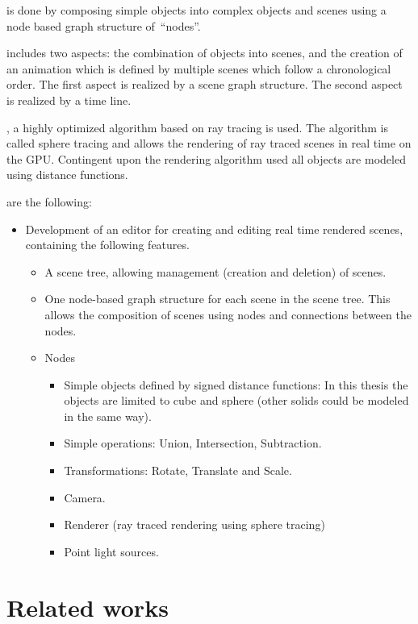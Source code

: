 \documentclass[%
    a4paper,    %
    justified,  %
    nobib,      %
    openany     %
]{tufte-book}
\makeatletter
\renewcommand{\label}[1]{\@tufte@label{##1}}%
\makeatother
\begin{document}
 is done by composing simple objects into complex objects
and scenes using a node based graph structure of~\enquote{nodes}.

 includes two aspects: the combination of objects into
scenes, and the creation of an animation which is defined by multiple scenes
which follow a chronological order. The first aspect is realized by a scene
graph structure. The second aspect is realized by a time line.

, a highly optimized algorithm based on ray tracing is
used. The algorithm is called sphere tracing and allows the rendering of ray
traced scenes in real time on the GPU. Contingent upon the rendering algorithm
used all objects are modeled using distance functions.

 are the following:
\begin{itemize}
  \item Development of an editor for creating and editing real time rendered
    scenes, containing the following features.
    \begin{itemize}
      \item A scene tree, allowing management (creation and deletion) of
        scenes.
      \item One node-based graph structure for each scene in the scene tree.
        This allows the composition of scenes using
        nodes and connections between the nodes.
    \item Nodes
      \begin{itemize}
        \item Simple objects defined by signed distance functions: In this
          thesis the objects are limited to cube and sphere (other solids could
          be modeled in the same way).
        \item Simple operations: Union, Intersection, Subtraction.
        \item Transformations: Rotate, Translate and Scale.
        \item Camera.
        \item Renderer (ray traced rendering using sphere tracing)
        \item Point light sources.
      \end{itemize}
    \end{itemize}
\end{itemize}

\section{Related works}
\label{sec:related-works}
\end{document}
